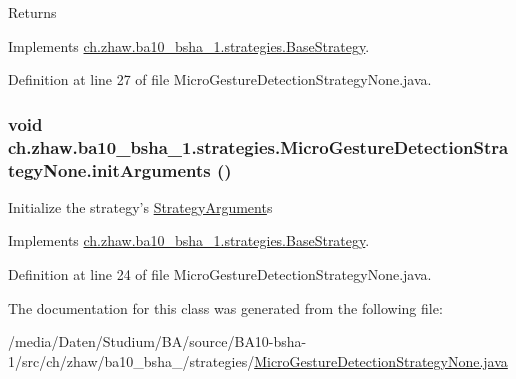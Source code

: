 \begin{DoxyReturn}{Returns}

\end{DoxyReturn}


Implements \hyperlink{classch_1_1zhaw_1_1ba10__bsha__1_1_1strategies_1_1BaseStrategy_aa0ebed55eed45409bad13d43a0058780}{ch.zhaw.ba10\_\-bsha\_\-1.strategies.BaseStrategy}.

Definition at line 27 of file MicroGestureDetectionStrategyNone.java.\hypertarget{classch_1_1zhaw_1_1ba10__bsha__1_1_1strategies_1_1MicroGestureDetectionStrategyNone_a61ad4d054ea04b24bf364d99f866e35c}{
\subsubsection[{initArguments}]{\setlength{\rightskip}{0pt plus 5cm}void ch.zhaw.ba10\_\-bsha\_\-1.strategies.MicroGestureDetectionStrategyNone.initArguments ()}}
\label{classch_1_1zhaw_1_1ba10__bsha__1_1_1strategies_1_1MicroGestureDetectionStrategyNone_a61ad4d054ea04b24bf364d99f866e35c}
Initialize the strategy's \hyperlink{classch_1_1zhaw_1_1ba10__bsha__1_1_1StrategyArgument}{StrategyArgument}s 

Implements \hyperlink{classch_1_1zhaw_1_1ba10__bsha__1_1_1strategies_1_1BaseStrategy_a0496e8fd0099a5f0f7765322d7e752a9}{ch.zhaw.ba10\_\-bsha\_\-1.strategies.BaseStrategy}.

Definition at line 24 of file MicroGestureDetectionStrategyNone.java.

The documentation for this class was generated from the following file:\begin{DoxyCompactItemize}
\item 
/media/Daten/Studium/BA/source/BA10-\/bsha-\/1/src/ch/zhaw/ba10\_\-bsha\_/strategies/\hyperlink{MicroGestureDetectionStrategyNone_8java}{MicroGestureDetectionStrategyNone.java}\end{DoxyCompactItemize}
